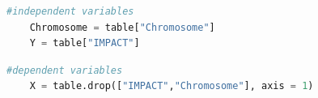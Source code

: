 \begin{lstlisting}[language=Python]
#independent variables 
    Chromosome = table["Chromosome"]
    Y = table["IMPACT"]
\end{lstlisting}

\begin{lstlisting}[language=Python]
#dependent variables
    X = table.drop(["IMPACT","Chromosome"], axis = 1)
\end{lstlisting}
